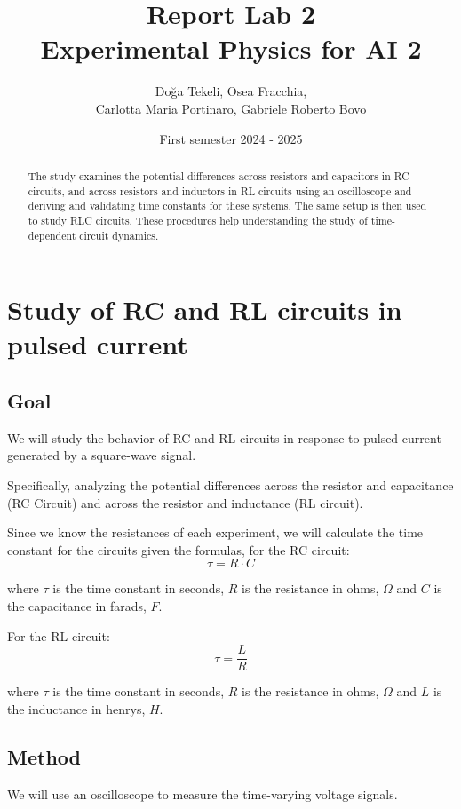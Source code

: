 \documentclass[notitlepage]{report}
\title{Report Lab 2\\\small Experimental Physics for AI 2}
\author{Doğa Tekeli, Osea Fracchia, \\ Carlotta Maria Portinaro, Gabriele
Roberto Bovo}
\date{First semester 2024 \-- 2025}
\numberwithin{equation}{section}
\theoremstyle{plain}
\theoremstyle{definition}
\theoremstyle{remark}
\begin{document}
\maketitle

\begin{abstract}
The study examines the potential differences across resistors and capacitors in
RC circuits, and across resistors and inductors in RL circuits using an
oscilloscope and deriving and validating time constants for these systems. The
same setup is then used to study RLC circuits. These
procedures help understanding the study of time-dependent circuit dynamics.
\end{abstract}

\chapter{Study of RC and RL circuits in pulsed current }

\section{Goal}
We will study the behavior of RC and RL circuits in response to pulsed current generated by a square-wave signal. 

Specifically, analyzing the potential differences across the resistor and capacitance (RC Circuit) and across the resistor and inductance (RL circuit). 

Since we know the resistances of each experiment, we will calculate the time constant for the circuits given the formulas, for the RC circuit:
\[
\tau = R \cdot C
\]

where \( \tau \) is the time constant in seconds,  \( R \) is the resistance in ohms, \( \Omega \) and \( C \) is the capacitance in farads, \( F \).



For the RL circuit:
\[
\tau = \frac{L}{R}
\]

where \( \tau \) is the time constant in seconds,  \( R \) is the resistance in ohms, \( \Omega \) and \( L \) is the inductance in henrys, \( H \).

\section{Method}
We will use an oscilloscope to measure the time-varying voltage signals. 
\end{document}

